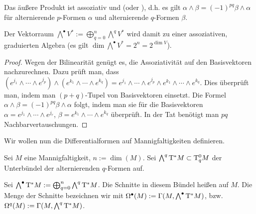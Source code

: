 \begin{st} \label{6.6}
    Das äußere Produkt ist assoziativ und  (oder ), d.h. es gilt
    \begin{math}
        \alpha \wedge \beta = (-1)^{pq} \beta \wedge \alpha
    \end{math}
    für alternierende $p$-Formen $\alpha$ und alternierende $q$-Formen $\beta$.

    Der Vektorraum $\bigwedge^{\bullet} V^\ast := \bigoplus_{q=0}^n \bigwedge^q V^*$ wird damit zu einer assoziativen, graduierten Algebra (es gilt $\dim \bigwedge^\bullet V^\ast = 2^n = 2^{\dim V}$).
    \begin{proof}
        Wegen der Bilinearität genügt es, die Assoziativität auf den Basisvektoren nachzurechnen.
        Dazu prüft man, dass
        \begin{math}
            (e^{j_1} \wedge \dotsb \wedge e^{j_p}) \wedge (e^{k_1} \wedge \dotsb \wedge e^{k_q})
            = e^{j_1} \wedge \dotsb \wedge e^{j_p} \wedge e^{k_1} \wedge \dotsb \wedge e^{k_q}.
        \end{math}
        Dies überprüft man, indem man $(p+q)$-Tupel von Basisvektoren einsetzt.
        Die Formel $\alpha \wedge \beta = (-1)^{pq} \beta \wedge \alpha$ folgt, indem man sie für die Basisvektoren $\alpha = e^{j_1} \wedge \dotsb \wedge e^{j_r}$, $\beta = e^{k_1} \wedge \dotsb \wedge e^{k_q}$ überprüft.
        In der Tat benötigt man $pq$ Nachbarvertauschungen.
    \end{proof}
\end{st}

Wir wollen nun die Differentialformen auf Mannigfaltigkeiten definieren.

\begin{df} \label{6.7}
    Sei $M$ eine Mannigfaltigkeit, $n := \dim(M)$.
    Sei $\bigwedge^q \mathrm{T}^* M \subset \mathrm{T}^0_q M$ der Unterbündel der alternierenden $q$-Formen auf.

    Sei $\bigwedge^\bullet \mathrm{T}^* M := \bigoplus_{q=0}^n \bigwedge^q \mathrm{T}^* M$.
    Die Schnitte in diesem Bündel heißen  auf $M$.
    Die Menge der Schnitte bezeichnen wir mit $\Omega^\bullet(M) := \Gamma(M, \bigwedge^\bullet \mathrm{T}^* M)$, bzw. $\Omega^q(M) := \Gamma(M, \bigwedge^q \mathrm{T}^* M)$.
\end{df}

